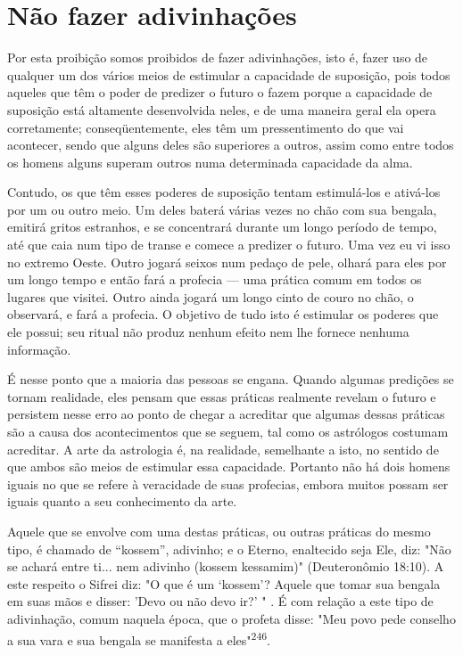 \section{Não fazer adivinhações}

Por esta proibição somos proibidos de fazer adivinhações, isto é, fa­zer
uso de qualquer um dos vários meios de estimular a capacidade de
suposi­ção, pois todos aqueles que têm o poder de predizer o futuro o
fazem porque a capacidade de suposição está altamente desenvolvida
neles, e de uma manei­ra geral ela opera corretamente; conseqüentemente,
eles têm um pressentimento do que vai acontecer, sendo que alguns deles
são superiores a outros, assim como entre todos os homens alguns superam
outros numa determinada capa­cidade da alma.

Contudo, os que têm esses poderes de suposição tentam estimulá-los e
ativá-los por um ou outro meio. Um deles baterá várias vezes no chão com
sua bengala, emitirá gritos estranhos, e se concentrará durante um longo
perío­do de tempo, até que caia num tipo de transe e comece a predizer o
futuro. Uma vez eu vi isso no extremo Oeste. Outro jogará seixos num
pedaço de pele, olhará para eles por um longo tempo e então fará a
profecia --- uma prática co­mum em todos os lugares que visitei. Outro
ainda jogará um longo cinto de couro no chão, o observará, e fará a
profecia. O objetivo de tudo isto é estimu­lar os poderes que ele
possui; seu ritual não produz nenhum efeito nem lhe fornece nenhuma
informação.

É nesse ponto que a maioria das pessoas se engana. Quando algumas
predições se tornam realidade, eles pensam que essas práticas realmente
reve­lam o futuro e persistem nesse erro ao ponto de chegar a acreditar
que algumas dessas práticas são a causa dos acontecimentos que se
seguem, tal como os as­trólogos costumam acreditar. A arte da astrologia
é, na realidade, semelhante a isto, no sentido de que ambos são meios de
estimular essa capacidade. Portanto não há 
dois homens iguais no que se refere à veracidade de suas
profe­cias, embora muitos possam ser iguais quanto a seu conhecimento da
arte.

Aquele que se envolve com uma destas práticas, ou outras práticas do
mesmo tipo, é chamado de ``kossem'', adivinho; e o Eterno, enaltecido seja
Ele, diz: "Não se achará entre ti... nem adivinho (kossem kessamim)"
(Deutero­nômio 18:10). A este respeito o Sifrei diz: "O que é um
`kossem'? Aquele que tomar sua bengala em suas mãos e disser: 'Devo ou
não devo ir?' " . É com rela­ção a este tipo de adivinhação, comum
naquela época, que o profeta disse: "Meu povo pede conselho a sua vara e
sua bengala se manifesta a eles"\textsuperscript{246}.

